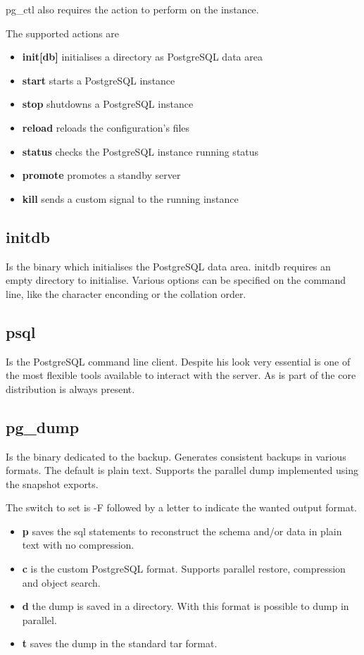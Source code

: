 pg\_ctl also requires the action to perform on the instance.

The supported actions are

\begin{itemize}
 \item \textbf{init[db]} initialises a directory as PostgreSQL data area
 \item \textbf{start} starts a PostgreSQL instance
 \item \textbf{stop} shutdowns a PostgreSQL instance
 \item \textbf{reload} reloads the configuration's files
 \item \textbf{status} checks the PostgreSQL instance running status
 \item \textbf{promote} promotes a standby server 
 \item \textbf{kill} sends a custom signal to the running instance
\end{itemize}


\subsection{initdb}
Is the binary which initialises the PostgreSQL data area. 
initdb requires an empty directory to initialise. 
Various options can be specified on the command line, like the character enconding or the collation order. 


\subsection{psql}
Is the PostgreSQL command line client. 
Despite his look very essential is one of the most flexible tools available to interact with the server.
As is part of the core distribution is always present.

\subsection{pg\_dump}
Is the binary dedicated to the backup. Generates consistent backups in various formats. The default is plain text. 
Supports the parallel dump implemented using the snapshot exports. 

The switch to set is -F followed by a letter to indicate the wanted output format.

\begin{itemize}
 \item \textbf{p} saves the sql statements to reconstruct the schema and/or data in plain text with no compression.
 \item \textbf{c} is the custom PostgreSQL format. Supports parallel restore, compression and object search.
 \item \textbf{d} the dump is saved in a directory. With this format is possible to dump in parallel.
 \item \textbf{t} saves the dump in the standard tar format.
 \end{itemize}

